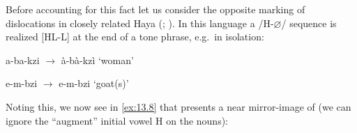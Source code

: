 \documentclass[output=paper]{langsci/langscibook}
\begin{document}
Before accounting for this fact let us consider the opposite marking of
dislocations in closely related Haya
(\citealt[201--202]{ByarushengoHymanTenenbaum1976};
\citealt[155]{HymanKatamba1999}). In this language a /H-$\varnothing$/ sequence is realized
[HL-L] at the end of a tone phrase, e.g.\ in isolation:

\ea\label{ex:13.7}
    \ea a-ba-kzi  ${\rightarrow}$  à-bà-kzì  ‘woman’ \\
    \ex e-m-bzi  ${\rightarrow}$  e-m-bzi  ‘goat(s)’ \\
    \z
\z

Noting this, we now see in \eqref{ex:13.8} that  presents a near
mirror-image of  (we can ignore the “augment” initial vowel H on the
nouns):
\end{document}
